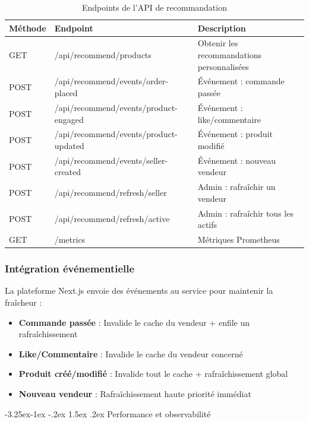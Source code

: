 \documentclass[12pt,a4paper,openany]{report}
\makeatletter
\renewcommand\subsection{\@startsection{subsection}{2}{\z@}%
  {-3.25ex\@plus -1ex \@minus -.2ex}%
  {1.5ex \@plus .2ex}%
  {\needspace{8\baselineskip}\normalfont\large\bfseries\color{primary!80!black}}}
\makeatother
\begin{document}
\begin{table}[H]
\centering
{}
\begin{tabularx}{\textwidth}{llX}
\toprule
\rowcolor{headerblue!20}
\textbf{Méthode} & \textbf{Endpoint} & \textbf{Description} \\
\midrule
GET  & /api/recommend/products            & Obtenir les recommandations personnalisées \\
POST & /api/recommend/events/order-placed  & Événement : commande passée \\
POST & /api/recommend/events/product-engaged & Événement : like/commentaire \\
POST & /api/recommend/events/product-updated & Événement : produit modifié \\
POST & /api/recommend/events/seller-created  & Événement : nouveau vendeur \\
POST & /api/recommend/refresh/seller      & Admin : rafraîchir un vendeur \\
POST & /api/recommend/refresh/active      & Admin : rafraîchir tous les actifs \\
GET  & /metrics                           & Métriques Prometheus \\
\bottomrule
\end{tabularx}
\caption{Endpoints de l'API de recommandation}
\end{table}

\subsubsection{Intégration événementielle}

La plateforme Next.js envoie des événements au service pour maintenir la fraîcheur :
\begin{itemize}
  \item \textbf{Commande passée} : Invalide le cache du vendeur + enfile un rafraîchissement
  \item \textbf{Like/Commentaire} : Invalide le cache du vendeur concerné
  \item \textbf{Produit créé/modifié} : Invalide tout le cache + rafraîchissement global
  \item \textbf{Nouveau vendeur} : Rafraîchissement haute priorité immédiat
\end{itemize}

\subsection{Performance et observabilité}
\end{document}
